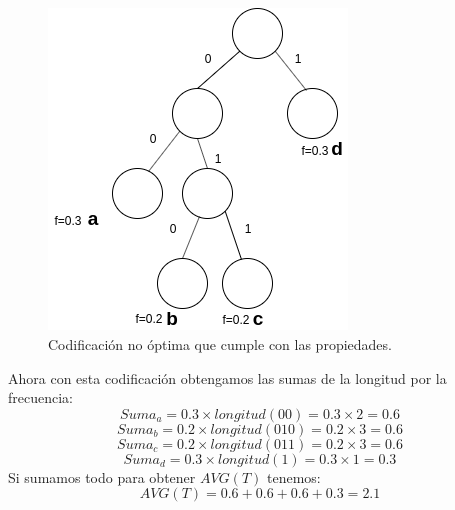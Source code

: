 \documentclass[12pt]{article}
\begin{document}
\subsection{}
\begin{figure}[h]
	\begin{center}
		\includegraphics[scale=0.5]{codificacion}
	\end{center}
	\caption{Codificación no óptima que cumple con las propiedades.}
\end{figure}
Ahora con esta codificación obtengamos las sumas de la longitud por la frecuencia:
\begin{equation}
Suma_a = 0.3 \times longitud(00) = 0.3 \times 2 = 0.6
\end{equation}
\begin{equation}
Suma_b = 0.2 \times longitud(010) = 0.2 \times 3 = 0.6
\end{equation}
\begin{equation}
Suma_c = 0.2 \times longitud(011) = 0.2 \times 3 = 0.6
\end{equation}
\begin{equation}
Suma_d = 0.3 \times longitud(1) = 0.3 \times 1 = 0.3
\end{equation}
Si sumamos todo para obtener $AVG(T)$ tenemos:
\begin{equation}
AVG(T)= 0.6 + 0.6 + 0.6  + 0.3 = 2.1
\end{equation}
\end{document}
